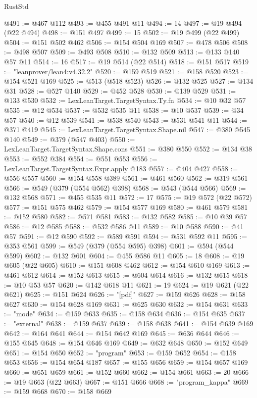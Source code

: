 \begin{lexlean}{RustStd}
\begin{coremodule}
@491 := @467 @112
@493 := @455 @491 @11
@494 := 14
@497 := @19 @494 (@22 @494)
@498 := @151 @497
@499 := 15
@502 := @19 @499 (@22 @499)
@504 := @151 @502 @462
@506 := @154 @504 @169
@507 := @478 @506
@508 := @498 @507
@509 := @493 @508
@510 := @132 @509
@513 := @133 @140 @57 @11
@514 := 16
@517 := @19 @514 (@22 @514)
@518 := @151 @517
@519 := "leanprover/lean4:v4.32.2"
@520 := @159 @519
@521 := @158 @520
@523 := @154 @521 @169
@525 := @513 (@518 @523)
@526 := @132 @525
@527 := @134 @31
@528 := @527 @140
@529 := @452 @528
@530 := @139 @529
@531 := @133 @530
@532 := LexLeanTarget.TargetSyntax.Ty.fn
@534 := @10 @32 @57
@535 := @12 @534
@537 := @532 @535 @11
@538 := @10 @537
@539 := @34 @57
@540 := @12 @539
@541 := @538 @540
@543 := @531 @541 @11
@544 := @371 @419
@545 := LexLeanTarget.TargetSyntax.Shape.nil
@547 := @380 @545 @140
@549 := @379 (@547 @403)
@550 := LexLeanTarget.TargetSyntax.Shape.cons
@551 := @380 @550
@552 := @134 @38
@553 := @552 @384
@554 := @551 @553
@556 := LexLeanTarget.TargetSyntax.Expr.apply @183
@557 := @404 @427
@558 := @556 @557
@560 := @154 @558 @389
@561 := @461 @560
@562 := @319 @561
@566 := @549 (@379 (@554 @562) @398)
@568 := @543 (@544 @566)
@569 := @132 @568
@571 := @455 @535 @11
@572 := 17
@575 := @19 @572 (@22 @572)
@577 := @151 @575 @462
@579 := @154 @577 @169
@580 := @461 @579
@581 := @152 @580
@582 := @571 @581
@583 := @132 @582
@585 := @10 @39 @57
@586 := @12 @585
@588 := @532 @586 @11
@589 := @10 @588
@590 := @41 @57
@591 := @12 @590
@592 := @589 @591
@594 := @531 @592 @11
@595 := @353 @561
@599 := @549 (@379 (@554 @595) @398)
@601 := @594 (@544 @599)
@602 := @132 @601
@604 := @455 @586 @11
@605 := 18
@608 := @19 @605 (@22 @605)
@610 := @151 @608 @462
@612 := @154 @610 @169
@613 := @461 @612
@614 := @152 @613
@615 := @604 @614
@616 := @132 @615
@618 := @10 @53 @57
@620 := @142 @618 @11
@621 := 19
@624 := @19 @621 (@22 @621)
@625 := @151 @624
@626 := "[pdf]"
@627 := @159 @626
@628 := @158 @627
@630 := @154 @628 @169
@631 := @625 @630
@632 := @154 @631
@633 := "mode"
@634 := @159 @633
@635 := @158 @634
@636 := @154 @635
@637 := "external"
@638 := @159 @637
@639 := @158 @638
@641 := @154 @639 @169
@642 := @164 @641
@644 := @154 @642 @169
@645 := @636 @644
@646 := @155 @645
@648 := @154 @646 @169
@649 := @632 @648
@650 := @152 @649
@651 := @154 @650
@652 := "program"
@653 := @159 @652
@654 := @158 @653
@656 := @154 @654 @187
@657 := @155 @656
@659 := @154 @657 @169
@660 := @651 @659
@661 := @152 @660
@662 := @154 @661
@663 := 20
@666 := @19 @663 (@22 @663)
@667 := @151 @666
@668 := "program_kappa"
@669 := @159 @668
@670 := @158 @669

\end{coremodule}
\end{lexlean}
